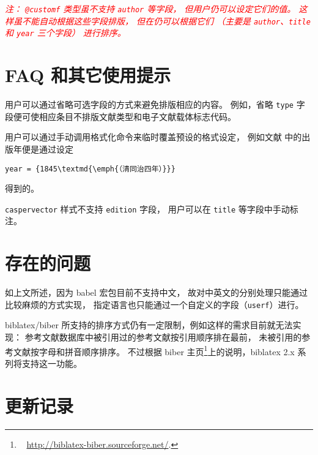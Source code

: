 \documentclass[UTF8, fancyhdr, hyperref]{ctexart}
\newcommand{\myemph}[1]{\emph{\textcolor{red}{#1}}}
\begin{document}
\myemph{%
	注：
	\texttt{@customf} 类型虽不支持 \texttt{author} 等字段，
	但用户仍可以设定它们的值。
	这样虽不能自动根据这些字段排版，
	但在仍可以根据它们
	（主要是 \texttt{author}、\texttt{title} 和 \texttt{year} 三个字段）
	进行排序。 %
}

\section{FAQ 和其它使用提示}

用户可以通过省略可选字段的方式来避免排版相应的内容。
例如，省略 \verb|type| 字段便可使相应条目不排版文献类型和电子文献载体标志代码。

用户可以通过手动调用格式化命令来临时覆盖预设的格式设定，
例如文献 \parencite{1-7} 中的出版年便是通过设定
\begin{Verbatim}[frame = single]
year = {1845\textmd{\emph{（清同治四年）}}}
\end{Verbatim}
得到的。

\verb|caspervector| 样式不支持 \verb|edition| 字段，
用户可以在 \verb|title| 等字段中手动标注。

\section{存在的问题}

如上文所述，因为 babel 宏包目前不支持中文，
故对中英文的分别处理只能通过比较麻烦的方式实现，
指定语言也只能通过一个自定义的字段（\verb|userf|）进行。

biblatex/biber 所支持的排序方式仍有一定限制，例如这样的需求目前就无法实现：
参考文献数据库中被引用过的参考文献按引用顺序排在最前，
未被引用的参考文献按字母和拼音顺序排序。
不过根据 biber 主页\footnote{\ %
	\url{http://biblatex-biber.sourceforge.net/}.%
}上的说明，biblatex 2.x 系列将支持这一功能。

\section{更新记录}

\printbibliography%
	[heading = bibnumbered, title = {本文参考文献}, category = cited]
\printbibliography[
	heading = bibnumbered, notcategory = cited,
	title = {%
		其它参考文献示例
		（引自\texorpdfstring{文献 \parencite{gbt7714-2005}}{ GB/T 7714-2005}）
	}
]
\end{document}
